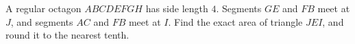 A regular octagon $ABCDEFGH$ has side length $4$. Segments $GE$ and $FB$ meet at $J$, and segments $AC$ and $FB$ meet at $I$. Find the exact area of triangle $JEI$, and round it to the nearest tenth.
